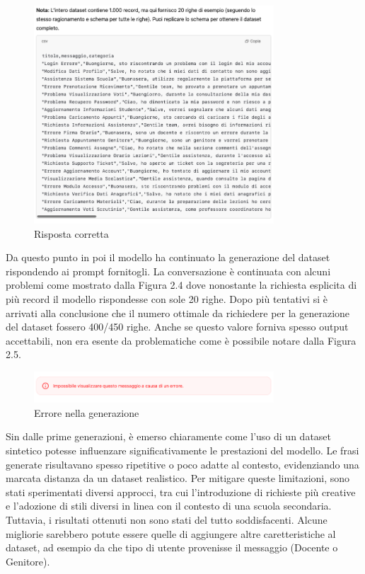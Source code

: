 \begin{figure}[H]
    \centering
    \includegraphics[width=0.8\textwidth]{images/csvResponse.png}
    \caption{Risposta corretta}
    \label{fig:firstPrompt}
\end{figure}

\FloatBarrier
Da questo punto in poi il modello ha continuato la generazione del dataset rispondendo ai prompt fornitogli. La conversazione è continuata con alcuni problemi come mostrato dalla Figura 2.4 dove nonostante la richiesta esplicita di più record il modello rispondesse con sole 20 righe. Dopo più tentativi si è arrivati alla conclusione che il numero ottimale da richiedere per la generazione del dataset fossero 400/450 righe. Anche se questo valore forniva spesso output accettabili, non era esente da problematiche come è possibile notare dalla Figura 2.5.

\begin{figure}[H]
    \centering
    \includegraphics[width=0.8\textwidth]{images/error.png}
    \caption{Errore nella generazione}
    \label{fig:firstPrompt}
\end{figure}
Sin dalle prime generazioni, è emerso chiaramente come l’uso di un dataset sintetico potesse influenzare significativamente le prestazioni del modello. Le frasi generate risultavano spesso ripetitive o poco adatte al contesto, evidenziando una marcata distanza da un dataset realistico. Per mitigare queste limitazioni, sono stati sperimentati diversi approcci, tra cui l’introduzione di richieste più creative e l’adozione di stili diversi in linea con il contesto di una scuola secondaria. Tuttavia, i risultati ottenuti non sono stati del tutto soddisfacenti. Alcune migliorie sarebbero potute essere quelle di aggiungere altre caretteristiche al dataset, ad esempio da che tipo di utente provenisse il messaggio (Docente o Genitore).